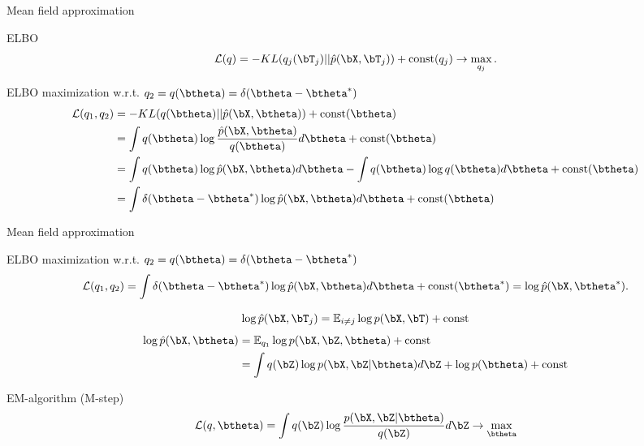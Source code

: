 \begin{frame}{Mean field approximation}
	\begin{block}{ELBO}
		\[
			\mathcal{L} (q) = - KL (q_j(\bT_j) || \hat{p}(\bX, \bT_j))  + \text{const}(q_j) \rightarrow \max_{q_j}.
		\]
	\vspace{-0.3cm}
	\end{block}
	\begin{block}{ELBO maximization w.r.t. $q_2 = q(\btheta) = \delta(\btheta - \btheta^*)$}
		\vspace{-0.3cm}
		\begin{align*}
			\mathcal{L} (q_1, q_2) &= - KL (q(\btheta) || \hat{p}(\bX, \btheta))  + \text{const}(\btheta) \\ 
			&= \int q (\btheta) \log \frac{\hat{p}(\bX, \btheta)}{q(\btheta)} d\btheta + \text{const}(\btheta) \\
			& = \int q (\btheta) \log \hat{p}(\bX, \btheta) d\btheta  - \int q (\btheta) \log q(\btheta) d\btheta + \text{const}(\btheta) \\
			& = \int \delta(\btheta - \btheta^*) \log \hat{p}(\bX, \btheta) d\btheta + \text{const}(\btheta) 
		\end{align*}
		\vspace{-0.3cm}
	\end{block}
\end{frame}
\begin{frame}{Mean field approximation}
	
	\begin{block}{ELBO maximization w.r.t. $q_2 = q(\btheta) = \delta(\btheta - \btheta^*)$}
		\vspace{-0.3cm}
		\[
			\mathcal{L} (q_1, q_2) = \int \delta(\btheta - \btheta^*) \log \hat{p}(\bX, \btheta) d\btheta + \text{const}(\btheta^*) = \log \hat{p}(\bX, \btheta^*).
		\]
	\end{block}
	\vspace{-0.3cm}
	\[
		\log \hat{p}(\bX, \bT_j) = \mathbb{E}_{i \neq j} \log p(\bX, \bT) + \text{const}
	\]
	\begin{align*}
		\log \hat{p}(\bX, \btheta) &= \mathbb{E}_{q_1} \log p(\bX, \bZ, \btheta) + \text{const} \\
		&= \int q(\bZ) \log p(\bX, \bZ|  \btheta) d\bZ + \log p(\btheta)+ \text{const}
	\end{align*}
	\vspace{-0.3cm}
	\begin{block}{EM-algorithm (M-step)}
		 \[
		 	\mathcal{L}(q, \btheta) =	\int q(\bZ) \log \frac{p(\bX, \bZ | \btheta)}{q(\bZ)}d\bZ \rightarrow \max_{\btheta}
		 \]
	\end{block}
\end{frame}
